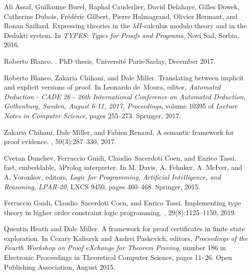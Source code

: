 \documentclass[a4paper]{easychair}
\begin{document}
%

\begin{thebibliography}{10}

Ali Assaf, Guillaume Burel, Raphal Cauderlier, David Delahaye, Gilles Dowek,
  Catherine Dubois, Fr{\'e}d{\'e}ric Gilbert, Pierre Halmagrand, Olivier
  Hermant, and Ronan Saillard.
\newblock Expressing theories in the $\lambda$${\Pi}$-calculus modulo theory
  and in the {Dedukti} system.
\newblock In {\em TYPES: Types for Proofs and Programs}, Novi Sad, Serbia,
  2016.

Roberto Blanco.
.
\newblock PhD thesis, Universit{\'e} Paris-Saclay, December 2017.

Roberto Blanco, Zakaria Chihani, and Dale Miller.
\newblock Translating between implicit and explicit versions of proof.
\newblock In Leonardo de~Moura, editor, {\em Automated Deduction - {CADE} 26 -
  26th International Conference on Automated Deduction, Gothenburg, Sweden,
  August 6-11, 2017, Proceedings}, volume 10395 of {\em Lecture Notes in
  Computer Science}, pages 255--273. Springer, 2017.

Zakaria Chihani, Dale Miller, and Fabien Renaud.
\newblock A semantic framework for proof evidence.
, 59(3):287--330, 2017.

Cvetan Dunchev, Ferruccio Guidi, Claudio~Sacerdoti Coen, and Enrico Tassi.
 fast, embeddable, $\lambda${Prolog} interpreter.
\newblock In M. Davis, A. Fehnker, A. McIver, and A. Voronkov, editors, 
{\em Logic for Programming, Artificial Intelligence, and
  Reasoning, LPAR-20}, LNCS 9450, pages 460--468. Springer, 2015.

Ferruccio Guidi, Claudio~Sacerdoti Coen, and Enrico Tassi.
\newblock Implementing type theory in higher order constraint logic
  programming.
, 29(8):1125--1150,
  2019.

Quentin Heath and Dale Miller.
\newblock A framework for proof certificates in finite state exploration.
\newblock In Cezary Kaliszyk and Andrei Paskevich, editors, {\em Proceedings of
  the Fourth Workshop on Proof eXchange for Theorem Proving}, number 186 in
  Electronic Proceedings in Theoretical Computer Science, pages 11--26. Open
  Publishing Association, August 2015.


\end{thebibliography}
\end{document}
